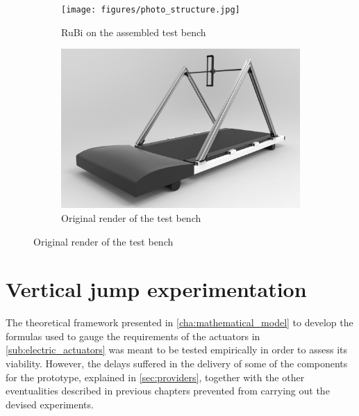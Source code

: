 \begin{figure}[ht!]
    \centering
    \begin{subfigure}[b]{0.49\textwidth}
        \texttt{[image: figures/photo\_structure.jpg]}
        \caption{RuBi on the assembled test bench}
        \label{fig:photo_structure}
    \end{subfigure}
    \begin{subfigure}[b]{0.49\textwidth}
        \includegraphics[width=\textwidth]{figures/legs_structure.jpg}
        \caption{Original render of the test bench}
        \label{fig:legs_structure}
    \end{subfigure}
\end{figure}  



\section{Vertical jump experimentation} %
\label{sec:vertical_jump_experimentation}
The theoretical framework presented in \ref{cha:mathematical_model} to develop the formulas used to gauge the requirements of the actuators in \ref{sub:electric_actuators} was meant to be tested empirically in order to assess its viability.
However, the delays suffered in the delivery of some of the components for the prototype, explained in \ref{sec:providers},
together with the other eventualities described in previous chapters prevented from carrying out the devised experiments.


